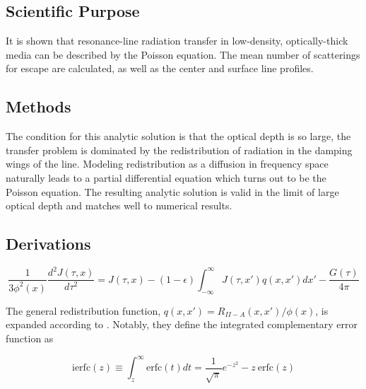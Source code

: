 \documentclass[onecolumn]{aastex63}
\begin{document}
\subsection{Scientific Purpose}
It is shown that resonance-line radiation transfer in low-density, optically-thick media can be described by the Poisson equation. The mean number of scatterings for escape are calculated, as well as the center and surface line profiles.

\subsection{Methods}
The condition for this analytic solution is that the optical depth is so large, the transfer problem is dominated by the redistribution of radiation in the damping wings of the line. Modeling redistribution as a diffusion in frequency space naturally leads to a partial differential equation which turns out to be the Poisson equation. The resulting analytic solution is valid in the limit of large optical depth and matches well to numerical results.

\subsection{Derivations}

\begin{equation} \label{harrington1}
    \frac{1}{3\phi^2(x)}\frac{d^2J(\tau, x)}{d\tau^2} = J(\tau, x) - (1-\epsilon)\int_{-\infty}^{\infty}J(\tau, x')q(x, x')dx' - \frac{G(\tau)}{4\pi}
\end{equation}

The general redistribution function, $q(x, x') = R_{II-A}(x, x')/\phi (x)$, is expanded according to \cite{1971JQSRT..11.1365A}. Notably, they define the integrated complementary error function as 

\begin{equation}
    \mathrm{ierfc}(z) \equiv \int_z^{\infty} \mathrm{erfc}(t) dt = \frac{1}{\sqrt{\pi}} e^{-z^2} - z\  \mathrm{erfc}(z)
\end{equation}
\end{document}
